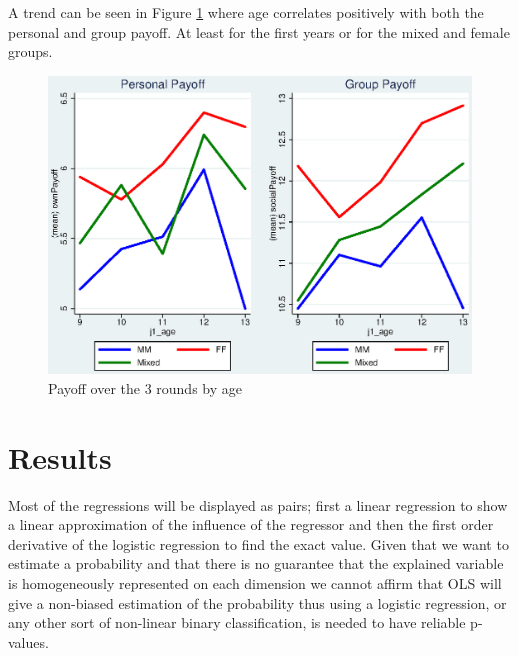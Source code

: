 \documentclass{article} %
\begin{document}
A trend can be seen in Figure \ref{fig:age} where age correlates positively with both the personal and group payoff. At least for the first years or for the mixed and female groups.
\begin{figure}[H]
\centering
\includegraphics[scale=1]{inc/age.eps}
\caption{Payoff over the 3 rounds by age}
\label{fig:age}
\end{figure}

\section{Results}
Most of the regressions will be displayed as pairs; first a linear regression to show a linear approximation of the influence of the regressor and then the first order derivative of the logistic regression to find the exact value. Given that we want to estimate a probability and that there is no guarantee that the explained variable is homogeneously represented on each dimension we cannot affirm that OLS will give a non-biased estimation of the probability thus using a logistic regression, or any other sort of non-linear binary classification, is needed to have reliable p-values.
\end{document}
